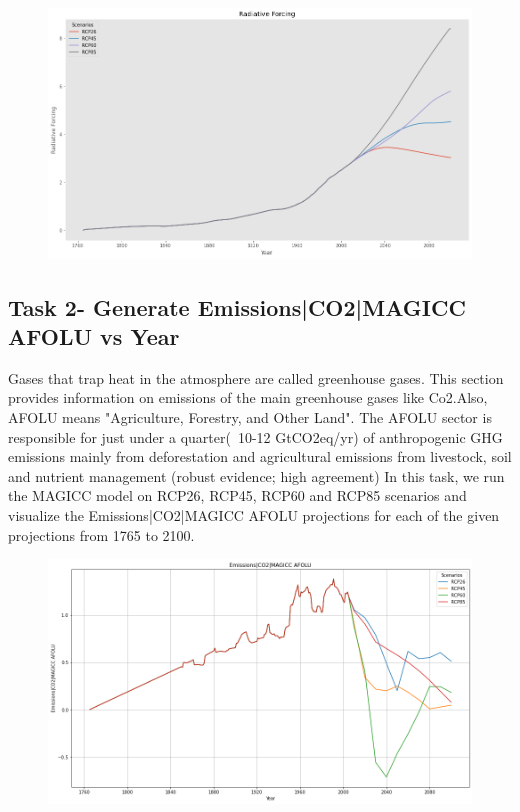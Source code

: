 \documentclass{article}
\begin{document}
\begin{figure}[h]
\includegraphics[width=\textwidth,height=\textheight,keepaspectratio]{Radioactive.png}
\end{figure}
 \begin{center}
\caption{Figure 1: Radiative Forcing by year based on RCP26, RCP45, RCP60 and RCP 85 data's}
\end{center}
\clearpage
\subsection{Task 2- Generate Emissions|CO2|MAGICC AFOLU vs Year}
Gases that trap heat in the atmosphere are called greenhouse gases. This section provides information on emissions of the main greenhouse gases like Co2.Also, AFOLU means "Agriculture, Forestry, and Other Land". The AFOLU sector is responsible for just under a quarter(~10-12 GtCO2eq/yr) of anthropogenic GHG emissions mainly from deforestation and agricultural emissions from livestock, soil and nutrient management (robust evidence; high agreement)\cite{4}
In this task, we run the MAGICC model on RCP26, RCP45, RCP60 and RCP85 scenarios and
visualize the Emissions|CO2|MAGICC AFOLU projections for each of the given projections from
1765 to 2100.
\begin{figure}[h]
\includegraphics[width=\textwidth,height=\textheight,keepaspectratio]{Emmissions.png}
\end{figure}
 \begin{center}
\caption{Figure 2: enerate Emissions—CO2—MAGICC AFOLU by year based on RCP26, RCP45, RCP60 and RCP 85 data's}
\end{center}
\vspace{5cm} 
\end{document}
